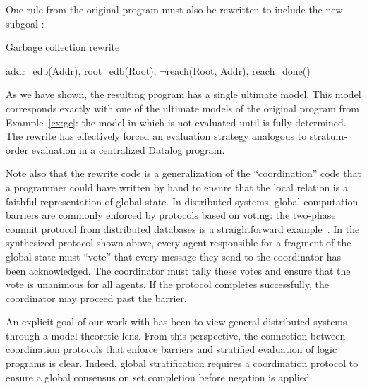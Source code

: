 One rule from the original program must also be rewritten to include the
new subgoal :

\begin{example}
Garbage collection rewrite

\begin{Drules}
        {addr_edb(Addr), root_edb(Root), $\lnot$reach(Root, Addr), reach_done()}
\end{Drules}
\end{example}

As we have shown, the resulting program has a single ultimate model.  This model
corresponds exactly with one of the ultimate models of the original program from
Example~\ref{ex:gc}: the model in which  is not evaluated until
 is fully determined.  The rewrite has effectively forced an
evaluation strategy analogous to stratum-order evaluation in a centralized
Datalog program.

Note also that the rewrite code is a generalization of the ``coordination'' code
that a \lang programmer could have written by hand to ensure that the local
relation  is a faithful representation of global state.  
In
distributed systems, global computation barriers are commonly enforced by
protocols based on voting: the two-phase commit protocol from distributed
databases is a straightforward example~\cite{gray-tp}.  In the synthesized protocol shown above, every agent
responsible for a fragment of the global state must ``vote'' that every message
they send to the coordinator has been acknowledged.  The coordinator must tally
these votes and ensure that the vote is unanimous for all agents.  If the
protocol completes successfully, the coordinator may proceed past the barrier.

An explicit goal of our work with \lang has been to view general distributed
systems through a model-theoretic lens.  From this perspective, the connection
between coordination protocols that enforce barriers and stratified evaluation 
of logic programs is clear.  Indeed, global stratification requires
a coordination protocol to ensure a global consensus on set completion before
negation is applied.





